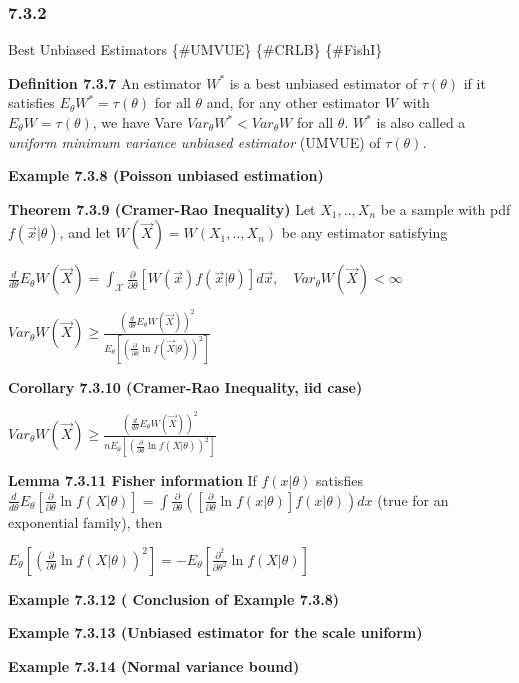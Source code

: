 \documentclass[10pt,twocolumn,portrait]{article}
\begin{document}
\hypertarget{section-5}{%
\subsubsection{7.3.2}\label{section-5}}

Best Unbiased Estimators \{\#UMVUE\} \{\#CRLB\} \{\#FishI\}

\textbf{Definition 7.3.7} An estimator \(W^*\) is a best unbiased
estimator of \(\tau(\theta)\) if it satisfies
\(E_\theta{W^*}=\tau(\theta)\) for all \(\theta\) and, for any other
estimator \(W\) with \(E_\theta{W}=\tau(\theta)\), we have Vare
\(Var_\theta{W^*}<Var_\theta{W}\) for all \(\theta\). \(W^*\) is also
called a \emph{uniform minimum variance unbiased estimator} (UMVUE) of
\(\tau(\theta)\).

\textbf{Example 7.3.8 (Poisson unbiased estimation)}

\textbf{Theorem 7.3.9 (Cramer-Rao Inequality)} Let \(X_1,..,X_n\) be a
sample with pdf \(f(\vec x|\theta)\), and let
\(W(\vec X)=W(X_1,..,X_n)\) be any estimator satisfying

\(\frac{d}{d\theta}E_\theta W(\vec X)=\int_{\mathcal{X}}\frac{\partial}{\partial\theta}\left[W(\vec x)f(\vec x|\theta)\right]d\vec x,\quad Var_\theta W(\vec X)<\infty\)

\(Var_\theta W(\vec X)\ge\frac{(\frac{d}{d\theta}E_\theta W(\vec X))^2}{E_\theta\left[(\frac{\partial}{\partial\theta}\ln f(\vec X|\theta))^2\right]}\)

\textbf{Corollary 7.3.10 (Cramer-Rao Inequality, iid case)}

\(Var_\theta W(\vec X)\ge\frac{(\frac{d}{d\theta}E_\theta W(\vec X))^2}{nE_\theta\left[(\frac{\partial}{\partial\theta}\ln f(X|\theta))^2\right]}\)

\textbf{Lemma 7.3.11 Fisher information} If \(f(x|\theta)\) satisfies
\(\frac{d}{d\theta}E_\theta\left[\frac{\partial}{\partial\theta}\ln f(X|\theta)\right]=\int\frac{\partial}{\partial\theta}\left(\left[\frac{\partial}{\partial\theta}\ln f(x|\theta)\right]f(x|\theta)\right)dx\)
(true for an exponential family), then

\(E_\theta\left[(\frac{\partial}{\partial\theta}\ln f(X|\theta))^2\right]=-E_\theta\left[\frac{\partial^2}{\partial\theta^2}\ln f(X|\theta)\right]\)

\textbf{Example 7.3.12 ( Conclusion of Example 7.3.8)}

\textbf{Example 7.3.13 (Unbiased estimator for the scale uniform)}

\textbf{Example 7.3.14 (Normal variance bound)}
\end{document}
